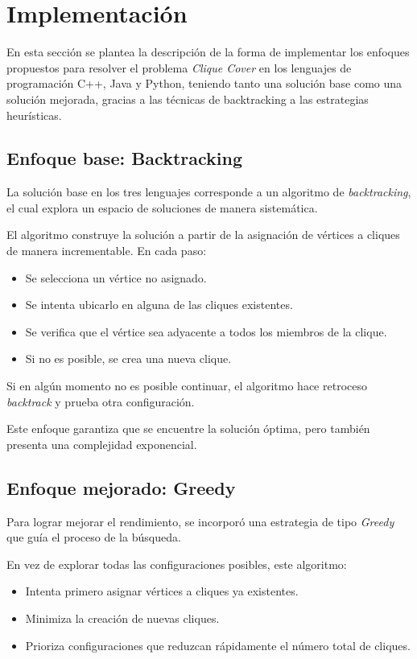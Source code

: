 \section{Implementación}

En esta sección se plantea la descripción de la forma de implementar los enfoques propuestos para resolver el problema \textit{Clique Cover} en los lenguajes de programación C++, Java y Python, teniendo tanto una solución base como una solución mejorada, gracias a las técnicas de backtracking a las estrategias heurísticas.

\subsection{Enfoque base: Backtracking}

La solución base en los tres lenguajes corresponde a un algoritmo de \textit{backtracking}, el cual explora un espacio de soluciones de manera sistemática.

El algoritmo construye la solución a partir de la asignación de vértices a cliques de manera incrementable. En cada paso:

\begin{itemize}
    \item Se selecciona un vértice no asignado.
    \item Se intenta ubicarlo en alguna de las cliques existentes.
    \item Se verifica que el vértice sea adyacente a todos los miembros de la clique.
    \item Si no es posible, se crea una nueva clique.
\end{itemize}

Si en algún momento no es posible continuar, el algoritmo hace retroceso \textit{backtrack} y prueba otra configuración.

Este enfoque garantiza que se encuentre la solución óptima, pero también presenta una complejidad exponencial.

\subsection{Enfoque mejorado: Greedy}

Para lograr mejorar el rendimiento, se incorporó una estrategia de tipo \textit{Greedy} que guía el proceso de la búsqueda.

En vez de explorar todas las configuraciones posibles, este algoritmo:

\begin{itemize}
    \item Intenta primero asignar vértices a cliques ya existentes.
    \item Minimiza la creación de nuevas cliques.
    \item Prioriza configuraciones que reduzcan rápidamente el número total de cliques.
\end{itemize}


